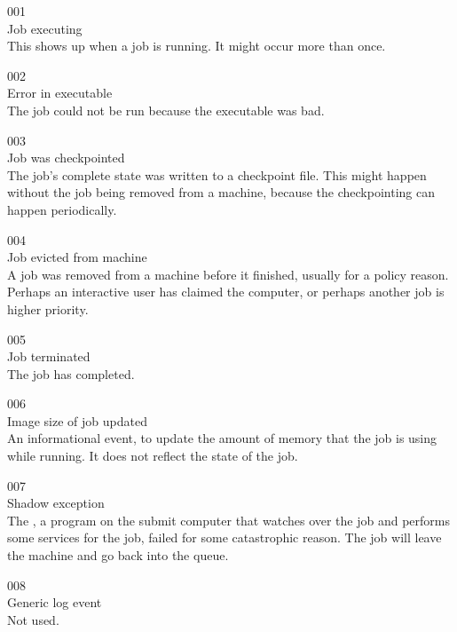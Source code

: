 \noindent{} 001 \\
 Job executing \\
 This shows up when a job is running.
It might occur more than once.

\noindent{} 002 \\
 Error in executable \\
 The job could not be run because the
executable was bad.

\noindent{} 003 \\
 Job was checkpointed \\
 The job's complete state was written to a checkpoint
file.  
This might happen without the job being removed from a machine,
because the checkpointing can happen periodically. 

\noindent{} 004 \\
 Job evicted from machine \\
 A job was removed from a machine before it finished,
usually for a policy reason. Perhaps an interactive user has claimed
the computer, or perhaps another job is higher priority.

\noindent{} 005 \\
 Job terminated \\
 The job has completed.

\noindent{} 006 \\
 Image size of job updated \\
 An informational event, 
to update the amount of memory that the job is using while running. 
It does not reflect the state of the job.

\noindent{} 007 \\
 Shadow exception \\
The , a program on the submit computer that watches
over the job and performs some services for the job, failed for some
catastrophic reason. The job will leave the machine and go back into
the queue.

\noindent{} 008 \\
 Generic log event \\
 Not used.

